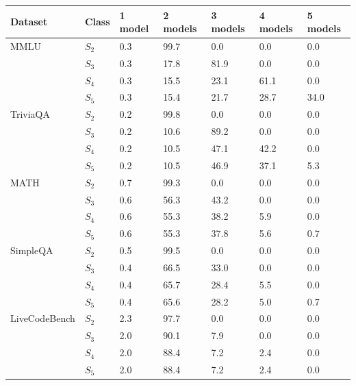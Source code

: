 \begin{tabular}{lllllll}
\toprule
Dataset & Class & 1 model & 2 models & 3 models & 4 models & 5 models \\
\midrule
MMLU & $S_2$ & 0.3 & 99.7 & 0.0 & 0.0 & 0.0 \\
 & $S_3$ & 0.3 & 17.8 & 81.9 & 0.0 & 0.0 \\
 & $S_4$ & 0.3 & 15.5 & 23.1 & 61.1 & 0.0 \\
 & $S_5$ & 0.3 & 15.4 & 21.7 & 28.7 & 34.0 \\
TriviaQA & $S_2$ & 0.2 & 99.8 & 0.0 & 0.0 & 0.0 \\
 & $S_3$ & 0.2 & 10.6 & 89.2 & 0.0 & 0.0 \\
 & $S_4$ & 0.2 & 10.5 & 47.1 & 42.2 & 0.0 \\
 & $S_5$ & 0.2 & 10.5 & 46.9 & 37.1 & 5.3 \\
MATH & $S_2$ & 0.7 & 99.3 & 0.0 & 0.0 & 0.0 \\
 & $S_3$ & 0.6 & 56.3 & 43.2 & 0.0 & 0.0 \\
 & $S_4$ & 0.6 & 55.3 & 38.2 & 5.9 & 0.0 \\
 & $S_5$ & 0.6 & 55.3 & 37.8 & 5.6 & 0.7 \\
SimpleQA & $S_2$ & 0.5 & 99.5 & 0.0 & 0.0 & 0.0 \\
 & $S_3$ & 0.4 & 66.5 & 33.0 & 0.0 & 0.0 \\
 & $S_4$ & 0.4 & 65.7 & 28.4 & 5.5 & 0.0 \\
 & $S_5$ & 0.4 & 65.6 & 28.2 & 5.0 & 0.7 \\
LiveCodeBench & $S_2$ & 2.3 & 97.7 & 0.0 & 0.0 & 0.0 \\
 & $S_3$ & 2.0 & 90.1 & 7.9 & 0.0 & 0.0 \\
 & $S_4$ & 2.0 & 88.4 & 7.2 & 2.4 & 0.0 \\
 & $S_5$ & 2.0 & 88.4 & 7.2 & 2.4 & 0.0 \\
\bottomrule
\end{tabular}
